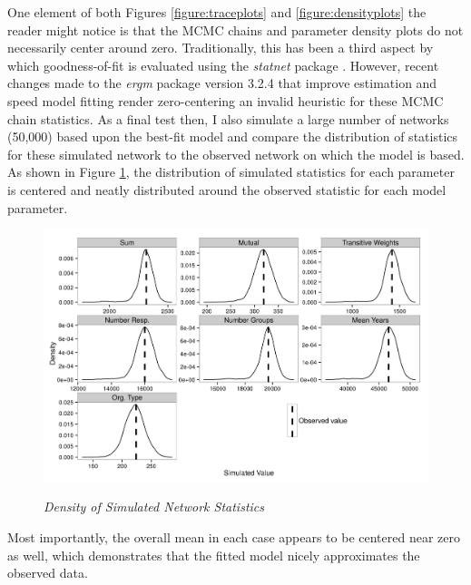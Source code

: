 \documentclass[12pt,a4paper,titlepage]{article}
\begin{document}
One element of both Figures \ref{figure:traceplots} and \ref{figure:densityplots} the reader might notice is that the MCMC chains and parameter density plots do not necessarily center around zero. Traditionally, this has been a third aspect by which goodness-of-fit is evaluated using the \textit{statnet} package \parencite{handcock2014-a}. However, recent changes made to the \textit{ergm} package version 3.2.4 \parencite{handcock2014-a} that improve estimation and speed model fitting render zero-centering an invalid heuristic for these MCMC chain statistics. As a final test then, I also simulate a large number of networks (50,000) based upon the best-fit model and compare the distribution of statistics for these simulated network to the observed network on which the model is based. As shown in Figure \ref{figure:simplots}, the distribution of simulated statistics for each parameter is centered and neatly distributed around the observed statistic for each model parameter.

\begin{figure}[!ht]
\caption{\textit{Density of Simulated Network Statistics}}
\graphicspath{ {`/Users/TScott/Google\space Drive/elwha/PSJ_Submission/Version3'}}
\noindent
\includegraphics[width=6.5in]
{simulationplot}
\label{figure:simplots}
\end{figure}




Most importantly, the overall mean in each case appears to be centered near zero as well, which demonstrates that the fitted model nicely approximates the observed data.
\end{document}
